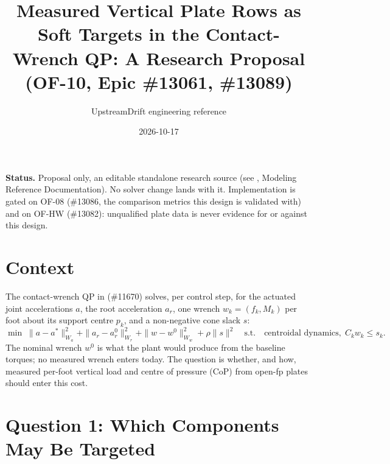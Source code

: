 \documentclass[11pt]{article}
\title{Measured Vertical Plate Rows as Soft Targets in the Contact-Wrench QP: A Research Proposal (OF-10, Epic \#13061, \#13089)}
\author{UpstreamDrift engineering reference}
\date{2026-10-17}
\begin{document}
\maketitle

\noindent\textbf{Status.} Proposal only, an editable standalone research
source (see , Modeling Reference Documentation). No solver
change lands with it. Implementation is gated on OF-08 (\#13086, the
comparison metrics this design is validated with) and on OF-HW (\#13082):
unqualified plate data is never evidence for or against this design.

\section{Context}

The contact-wrench QP in 
(\#11670) solves, per control step, for the actuated joint accelerations $a$,
the root acceleration $a_r$, one wrench $w_k = (f_k, M_k)$ per foot about its
support centre $p_k$, and a non-negative cone slack $s$:
\begin{equation}
  \min\; \|a-a^*\|^2_{W_a} + \|a_r-a_r^0\|^2_{W_r} + \|w-w^0\|^2_{W_w}
  + \rho\|s\|^2
  \quad\text{s.t.}\quad \text{centroidal dynamics},\; C_k w_k \le s_k .
\end{equation}
The nominal wrench $w^0$ is what the plant would produce from the baseline
torques; no measured wrench enters today. The question is whether, and how,
measured per-foot vertical load and centre of pressure (CoP) from open-fp
plates should enter this cost.

\section{Question 1: Which Components May Be Targeted}
\end{document}
